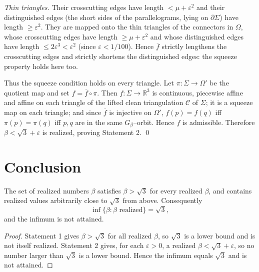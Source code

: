 \emph{Thin triangles.} Their crosscutting edges have length $<\mu+\varepsilon^2$ and
their distinguished edges (the short sides of the parallelograms, lying on
$\partial\Sigma$) have length $\ge\varepsilon^2$. They are mapped onto the thin
triangles of the connectors in $\Omega$, whose crosscutting edges have length
$\ge\mu+\varepsilon^2$ and whose distinguished edges have length
$\le 2\varepsilon^3<\varepsilon^2$ (since $\varepsilon<1/100$). Hence $\overline f$
strictly lengthens the crosscutting edges and strictly shortens the distinguished
edges: the squeeze property holds here too.

Thus the squeeze condition holds on every triangle. Let
$\pi\colon\Sigma\to\Omega'$ be the quotient map and set $f=\overline f\circ\pi$.
Then $f\colon\Sigma\to\mathbb{R}^3$ is continuous, piecewise affine and affine on
each triangle of the lifted clean triangulation $\mathcal C$ of $\Sigma$; it is a
squeeze map on each triangle; and since $\overline f$ is injective on $\Omega'$,
$f(p)=f(q)$ iff $\pi(p)=\pi(q)$ iff $p,q$ are in the same $G_\beta$--orbit. Hence
$f$ is admissible. Therefore $\beta<\sqrt3+\varepsilon$ is realized, proving
Statement 2. \qed

\section{Conclusion}

\begin{theorem}
The set of realized numbers $\beta$ satisfies $\beta>\sqrt3$ for every realized
$\beta$, and contains realized values arbitrarily close to $\sqrt3$ from above.
Consequently
\[
\inf\{\beta:\beta\text{ realized}\}=\sqrt3,
\]
and the infimum is not attained.
\end{theorem}

\begin{proof}
Statement 1 gives $\beta>\sqrt3$ for all realized $\beta$, so $\sqrt3$ is a lower
bound and is not itself realized. Statement 2 gives, for each $\varepsilon>0$, a
realized $\beta<\sqrt3+\varepsilon$, so no number larger than $\sqrt3$ is a lower
bound. Hence the infimum equals $\sqrt3$ and is not attained.
\end{proof}